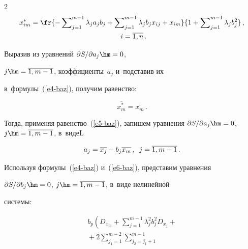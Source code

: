 \begin{multicols}{2}
\begin{multline}
    x^*_{im}=\fr{-\sum\nolimits_{j=1}^{m-1} \lambda_j a_j b_j 


+\sum\nolimits_{j=1}^{m-1} \lambda_j b_j x_{ij}+x_{im}} 


{1+\sum\nolimits_{j=1}^{m-1} \lambda_j b_j^2}\,,\\\enskip i=\overline{1,n}\,.


    \label{e4-baz}


    \end{multline}


    


    Выразив из уравнений $\partial S/\partial a_j\hm=0$, 


$j\hm= \overline{1,m-1}$, коэффициенты~$a_j$ и~подставив их 


в~формулы~(\ref{e4-baz}), получим равенство:


    \begin{equation}


    \overline{x_m^*}=\overline{x_m}\,.


    \label{e5-baz}


    \end{equation}




    Тогда, применяя равенство~(\ref{e5-baz}), запишем уравнения $\partial 


S/\partial a_j\hm=0$, $j\hm= \overline{1,m-1}$, в~видеL


    \begin{equation}


    a_j=\overline{x_j}-b_j \overline{x_m}\,,\enskip j=\overline{1,m-1}\,.


    \label{e6-baz}


    \end{equation}


    


    Используя формулы~(\ref{e4-baz}) и~(\ref{e6-baz}), представим уравнения 


$\partial S/\partial b_j\hm=0$, $j\hm= \overline{1,m-1}$, в~виде нелинейной 


системы:


    \begin{multline}


b_p\left( D_{x_m} +\sum\limits_{j=1}^{m-1} \lambda_j^2 b_j^2 D_{x_j}+\right.{}\\


{}+2 \sum\limits^{m-2}_{j_1=1} \sum\limits^{m-1}_{j_2=j_1+1} 



\end{multline}
\end{multicols}
